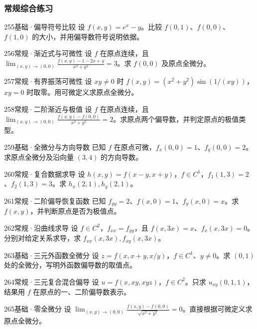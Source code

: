 \subsubsection{常规综合练习}
\begin{exercise}{255}{基础·偏导符号比较}
设 $f(x,y)=e^x-y$。比较 $f(0,1)$、$f(0,0)$、$f(1,0)$ 的大小，并用偏导数符号说明依据。
\end{exercise}
\begin{exercise}{256}{常规·渐近式与可微性}
设 $f$ 在原点连续，且 $\lim_{(x,y)\to(0,0)}\frac{f(x,y)-1-2x+y}{x^2+y^2}=3$。求 $f(0,0)$ 及原点全微分。
\end{exercise}
\begin{exercise}{257}{常规·有界振荡可微性}
设 $xy\ne0$ 时 $f(x,y)=(x^2+y^2)\sin(1/(xy))$，$xy=0$ 时取零。用可微定义求原点全微分。
\end{exercise}
\begin{exercise}{258}{常规·二阶渐近与极值}
设 $f$ 在原点连续，且 $\lim_{(x,y)\to(0,0)}\frac{f(x,y)-f(0,0)}{x^2+y^2}=2$。求原点两个偏导数，并判定原点的极值类型。
\end{exercise}
\begin{exercise}{259}{基础·全微分与方向导数}
已知 $f$ 在原点可微，$f_x(0,0)=1$、$f_y(0,0)=2$。求原点全微分及沿向量 $(3,4)$ 的方向导数。
\end{exercise}
\begin{exercise}{260}{常规·复合数据求导}
设 $h(x,y)=f(x-y,x+y)$，$f\in C^1$，$f_1(1,3)=2$、$f_2(1,3)=3$。求 $h_x(2,1),h_y(2,1)$。
\end{exercise}
\begin{exercise}{261}{常规·二阶偏导恢复函数}
已知 $f_{yy}=2$、$f(x,0)=1$、$f_y(x,0)=x$。求 $f(x,y)$，并判断原点是否为极值点。
\end{exercise}
\begin{exercise}{262}{常规·沿曲线求导}
设 $f\in C^2$，$f_{xx}=f_{yy}$，且 $f(x,3x)=x$、$f_x(x,3x)=0$。分别对给定关系求导，求 $f_{xx}(x,3x),f_{xy}(x,3x)$。
\end{exercise}
\begin{exercise}{263}{基础·三元外函数全微分}
设 $z=f(x,x+y,x/y)$，$f\in C^1$、$y\ne0$。求 $(0,1)$ 处的全微分，写明外函数偏导数的取值点。
\end{exercise}
\begin{exercise}{264}{常规·三元复合混合偏导}
设 $u=f(x,xy,xyz)$，$f\in C^2$。只求 $u_{xy}(0,1,1)$，结果用 $f$ 在原点的一、二阶偏导数表示。
\end{exercise}
\begin{exercise}{265}{基础·零全微分}
设 $\lim_{(x,y)\to(0,0)}\frac{f(x,y)-f(0,0)}{\sqrt{x^2+y^2}}=0$。直接根据可微定义求原点全微分。
\end{exercise}
